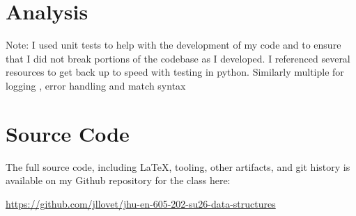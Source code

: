 \documentclass[10pt,letterpaper,final]{report}
\begin{document}
\pagebreak

\section{Analysis}

Note: I used unit tests to help with the development of my code and to ensure that I did not break portions of the codebase as I developed. I referenced several resources to get back up to speed with testing in python. \parencite{PythonDocumentationUnittestUnit, CodewithJosh2024HowToTest, CoreySchafer2017PythonTutorial, ArjanCodes2025HowToWriteGreatUnitTestsInPython} Similarly multiple for logging \parencite{PythonDocumentationLoggingLogging, PythonDocumentationLoggingCookbook}, error handling \parencite{PythonDocumentationErrorsAndExceptions} and match syntax \parencite{PythonEnhancementProposalsPEP0636}

\section*{Source Code}
The full source code, including LaTeX, tooling, other artifacts, and git history is available on my Github repository for the class here:
\begin{center}
  \url{https://github.com/jllovet/jhu-en-605-202-su26-data-structures}
\end{center}

\printbibliography
\end{document}
